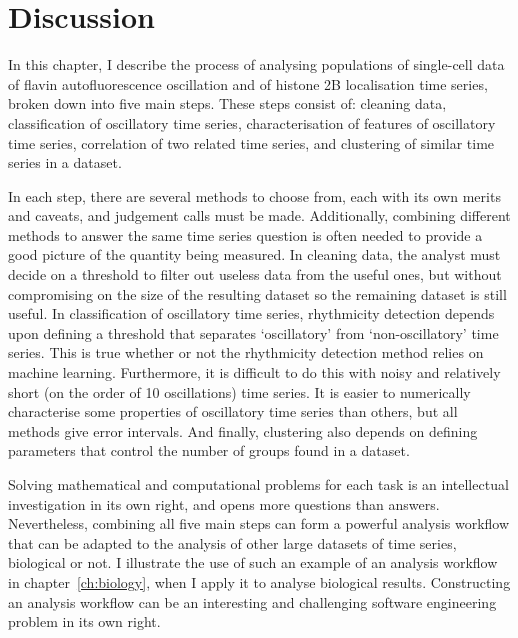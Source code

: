 \section{Discussion}
\label{sec:analysis-discussion}

In this chapter, I describe the process of analysing populations of single-cell data of flavin autofluorescence oscillation and of histone 2B localisation time series, broken down into five main steps.
These steps consist of: cleaning data, classification of oscillatory time series, characterisation of features of oscillatory time series, correlation of two related time series, and clustering of similar time series in a dataset.

In each step, there are several methods to choose from, each with its own merits and caveats, and judgement calls must be made.
Additionally, combining different methods to answer the same time series question is often needed to provide a good picture of the quantity being measured.
In cleaning data, the analyst must decide on a threshold to filter out useless data from the useful ones, but without compromising on the size of the resulting dataset so the remaining dataset is still useful.
In classification of oscillatory time series, rhythmicity detection depends upon defining a threshold that separates `oscillatory' from `non-oscillatory' time series.
This is true whether or not the rhythmicity detection method relies on machine learning.
Furthermore, it is difficult to do this with noisy and relatively short (on the order of 10 oscillations) time series.
It is easier to numerically characterise some properties of oscillatory time series than others, but all methods give error intervals.
And finally, clustering also depends on defining parameters that control the number of groups found in a dataset.

Solving mathematical and computational problems for each task is an intellectual investigation in its own right, and opens more questions than answers.
Nevertheless, combining all five main steps can form a powerful analysis workflow that can be adapted to the analysis of other large datasets of time series, biological or not.
I illustrate the use of such an example of an analysis workflow in chapter~\ref{ch:biology}, when I apply it to analyse biological results.
Constructing an analysis workflow can be an interesting and challenging software engineering problem in its own right.
